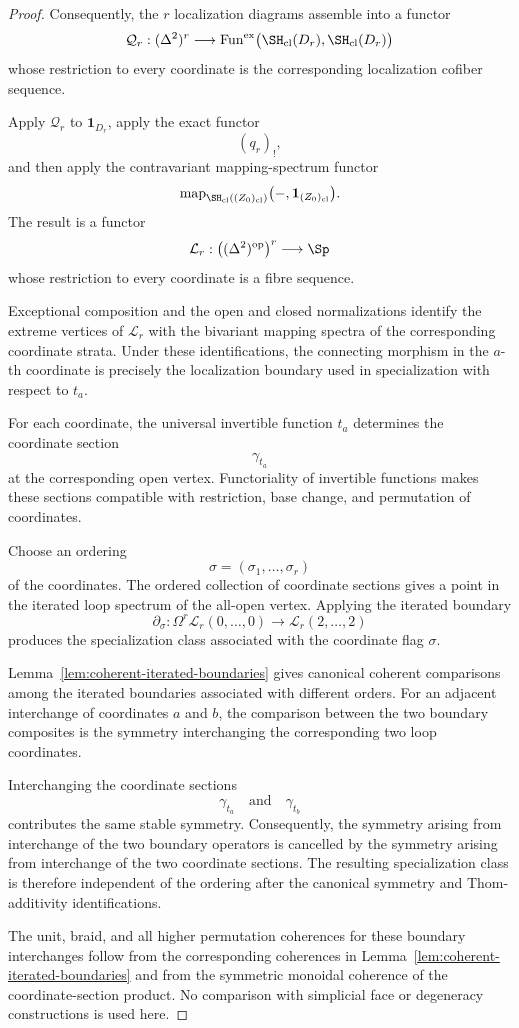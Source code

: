 \begin{proof}
Consequently, the \(r\) localization diagrams assemble into a functor
\[
    \mathcal Q_r:
    (\Delta^2)^r
    \longrightarrow
    \operatorname{Fun}^{\mathrm{ex}}
    \bigl(
      \SH_{\mathrm{cl}}(D_r),
      \SH_{\mathrm{cl}}(D_r)
    \bigr)
\]
whose restriction to every coordinate is the corresponding localization
cofiber sequence.

Apply \(\mathcal Q_r\) to \(\mathbf1_{D_r}\), apply the exact functor
\[
    (q_r)_!,
\]
and then apply the contravariant mapping-spectrum functor
\[
    \operatorname{map}_{\SH_{\mathrm{cl}}((Z_0)_{\mathrm{cl}})}
    \bigl(
      -,
      \mathbf1_{(Z_0)_{\mathrm{cl}}}
    \bigr).
\]
The result is a functor
\[
    \mathcal L_r:
    \bigl(
      (\Delta^2)^{\mathrm{op}}
    \bigr)^r
    \longrightarrow
    \Sp
\]
whose restriction to every coordinate is a fibre sequence.

Exceptional composition and the open and closed normalizations identify
the extreme vertices of \(\mathcal L_r\) with the bivariant mapping spectra
of the corresponding coordinate strata.  Under these identifications, the
connecting morphism in the \(a\)-th coordinate is precisely the
localization boundary used in specialization with respect to \(t_a\).

For each coordinate, the universal invertible function \(t_a\) determines
the coordinate section
\[
    \gamma_{t_a}
\]
at the corresponding open vertex.  Functoriality of invertible functions
makes these sections compatible with restriction, base change, and
permutation of coordinates.

Choose an ordering
\[
    \sigma=(\sigma_1,\ldots,\sigma_r)
\]
of the coordinates.  The ordered collection of coordinate sections gives
a point in the iterated loop spectrum of the all-open vertex.  Applying the
iterated boundary
\[
    \partial_\sigma:
    \Omega^r
    \mathcal L_r(0,\ldots,0)
    \longrightarrow
    \mathcal L_r(2,\ldots,2)
\]
produces the specialization class associated with the coordinate flag
\(\sigma\).

Lemma~\ref{lem:coherent-iterated-boundaries} gives canonical coherent
comparisons among the iterated boundaries associated with different
orders.  For an adjacent interchange of coordinates \(a\) and \(b\), the
comparison between the two boundary composites is the symmetry
interchanging the corresponding two loop coordinates.

Interchanging the coordinate sections
\[
    \gamma_{t_a}
    \quad\text{and}\quad
    \gamma_{t_b}
\]
contributes the same stable symmetry.  Consequently, the symmetry arising
from interchange of the two boundary operators is cancelled by the
symmetry arising from interchange of the two coordinate sections.  The
resulting specialization class is therefore independent of the ordering
after the canonical symmetry and Thom-additivity identifications.

The unit, braid, and all higher permutation coherences for these boundary
interchanges follow from the corresponding coherences in
Lemma~\ref{lem:coherent-iterated-boundaries}
and from the symmetric monoidal coherence of the coordinate-section
product.  No comparison with simplicial face or degeneracy constructions is
used here.
\end{proof}


